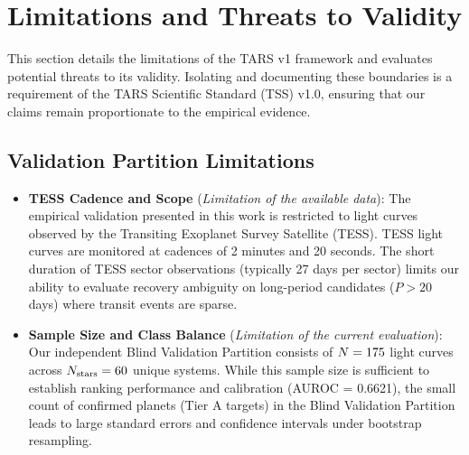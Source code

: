 \section{Limitations and Threats to Validity} \label{sec:limitations}

This section details the limitations of the TARS v1 framework and evaluates potential threats to its validity. Isolating and documenting these boundaries is a requirement of the TARS Scientific Standard (TSS) v1.0, ensuring that our claims remain proportionate to the empirical evidence.

\subsection{Validation Partition Limitations} \label{sec:limit_dataset}
\begin{itemize}
\item \textbf{TESS Cadence and Scope} (\textit{Limitation of the available data}): The empirical validation presented in this work is restricted to light curves observed by the Transiting Exoplanet Survey Satellite (TESS). TESS light curves are monitored at cadences of 2 minutes and 20 seconds. The short duration of TESS sector observations (typically 27 days per sector) limits our ability to evaluate recovery ambiguity on long-period candidates ($P > 20$ days) where transit events are sparse.
\item \textbf{Sample Size and Class Balance} (\textit{Limitation of the current evaluation}): Our independent Blind Validation Partition consists of $N = 175$ light curves across $N_{\text{stars}} = 60$ unique systems. While this sample size is sufficient to establish ranking performance and calibration (AUROC = 0.6621), the small count of confirmed planets (Tier A targets) in the Blind Validation Partition leads to large standard errors and confidence intervals under bootstrap resampling.
\end{itemize}

